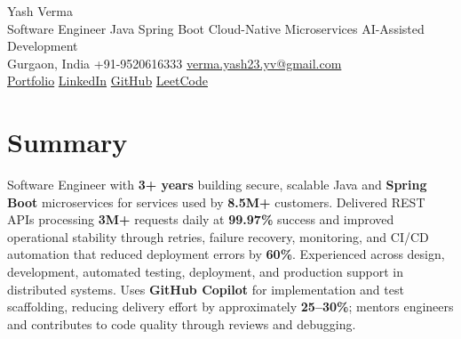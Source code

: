\documentclass[letterpaper,11pt]{article}
\begin{document}
\begin{center}
  {\Huge Yash Verma} \\
  \small Software Engineer \textperiodcentered{} Java \textperiodcentered{} Spring Boot \textperiodcentered{} Cloud-Native Microservices \textperiodcentered{} AI-Assisted Development \\
  \vspace{5pt}
  \small Gurgaon, India \textbar{} +91-9520616333 \textbar{}
  \href{mailto:verma.yash23.yv@gmail.com}{verma.yash23.yv@gmail.com} \\
  \vspace{7pt}
  \href{https://yashverma230600.github.io/yashV-portfolio/}{Portfolio} \textbar{}
  \href{https://www.linkedin.com/in/yash-verma-9243a7193/}{LinkedIn} \textbar{}
  \href{https://github.com/yashverma230600}{GitHub} \textbar{}
  \href{https://leetcode.com/yashverma230600}{LeetCode}
  \vspace{-8pt}
\end{center}

\section{Summary}
\begin{itemize}[leftmargin=0.15in, label={}]
  \small{\item{
    Software Engineer with \textbf{3+ years} building secure, scalable Java and \textbf{Spring Boot} microservices for services used by \textbf{8.5M+} customers. Delivered REST APIs processing \textbf{3M+} requests daily at \textbf{99.97\%} success and improved operational stability through retries, failure recovery, monitoring, and CI/CD automation that reduced deployment errors by \textbf{60\%}. Experienced across design, development, automated testing, deployment, and production support in distributed systems. Uses \textbf{GitHub Copilot} for implementation and test scaffolding, reducing delivery effort by approximately \textbf{25--30\%}; mentors engineers and contributes to code quality through reviews and debugging.
  }}
\end{itemize}
\vspace{-8pt}

\end{document}
